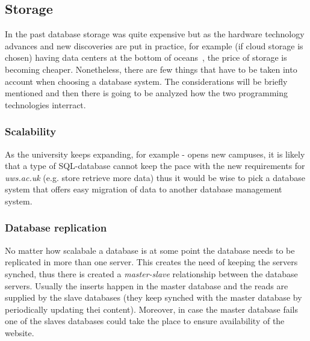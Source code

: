 \documentclass[11]{article}
\begin{document}



	\subsection{Storage}
		In the past database storage was quite expensive but as the hardware technology advances and new discoveries are put in practice, for example (if cloud storage is chosen) having data centers at the bottom of oceans~\citep{simon2018project}, the price of storage is becoming cheaper. Nonetheless, there are few things that have to be taken into account when choosing a database system. The considerations will be briefly mentioned and then there is going to be analyzed how the two programming technologies interract.

	\subsubsection{Scalability\\}
	As the university keeps expanding, for example - opens new campuses, it is likely that a type of SQL-database cannot keep the pace with the new requirements for \textit{uws.ac.uk} (e.g. store  retrieve more data) thus it would be wise to pick a database system that offers  easy migration of data to another database management system.

	\subsubsection{Database replication\\}
	No matter how scalabale a database is at some point the database needs to be replicated in more than one server. This creates the need of keeping the servers synched, thus there is created a \textit{master-slave} relationship between the database servers. Usually the inserts happen in the master database and the reads are supplied by the slave databases (they keep synched with the master database by periodically updating thei content). Moreover, in case the master database fails one of the slaves databases could take the place to ensure availability of the website.
\end{document}
